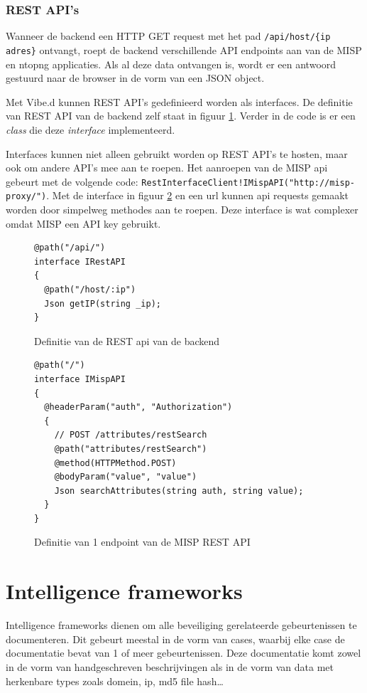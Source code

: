 \documentclass[a4paper,12pt]{report}
\begin{document}
\subsubsection{REST API's}
Wanneer de backend een HTTP GET request met het pad \lstinline|/api/host/{ip adres}| ontvangt, roept de backend verschillende API endpoints aan van de MISP en ntopng applicaties.
Als al deze data ontvangen is, wordt er een antwoord gestuurd naar de browser in de vorm van een JSON object.

Met Vibe.d kunnen REST API's gedefinieerd worden als interfaces.
De definitie van REST API van de backend zelf staat in figuur \ref{fig:vibe-rest-server}.
Verder in de code is er een \emph{class} die deze \emph{interface} implementeerd.

Interfaces kunnen niet alleen gebruikt worden op REST API's te hosten, maar ook om andere API's mee aan te roepen.
Het aanroepen van de MISP api gebeurt met de volgende code: \lstinline|RestInterfaceClient!IMispAPI("http://misp-proxy/")|.
Met de interface in figuur \ref{fig:vibe-rest-misp} en een url kunnen api requests gemaakt worden door simpelweg methodes aan te roepen.
Deze interface is wat complexer omdat MISP een API key gebruikt.

\begin{figure}[H]
  \begin{lstlisting}
@path("/api/")
interface IRestAPI
{
  @path("/host/:ip")
  Json getIP(string _ip);
}
  \end{lstlisting}
  \caption{Definitie van de REST api van de backend}
  \label{fig:vibe-rest-server}
\end{figure}

\begin{figure}[H]
  \begin{lstlisting}
@path("/")
interface IMispAPI
{
  @headerParam("auth", "Authorization")
  {
    // POST /attributes/restSearch
    @path("attributes/restSearch")
    @method(HTTPMethod.POST)
    @bodyParam("value", "value")
    Json searchAttributes(string auth, string value);
  }
}
  \end{lstlisting}
  \caption{Definitie van 1 endpoint van de MISP REST API}
  \label{fig:vibe-rest-misp}
\end{figure}

\section{Intelligence frameworks}
Intelligence frameworks dienen om alle beveiliging gerelateerde gebeurtenissen te documenteren.
Dit gebeurt meestal in de vorm van cases, waarbij elke case de documentatie bevat van 1 of meer gebeurtenissen.
Deze documentatie komt zowel in de vorm van handgeschreven beschrijvingen als in de vorm van data met herkenbare types zoals domein, ip, md5 file hash\dots
\end{document}
